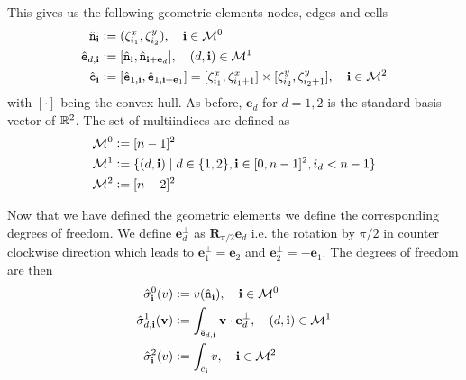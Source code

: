\documentclass[../master_thesis.tex]{subfiles}
\begin{document}
This gives us the following geometric elements nodes, edges and cells
\begin{align*}
    \hat{\mathtt{n}}_\mathbf{i} &\vcentcolon= (\zeta^x_{i_1}, \zeta^y_{i_2}), \quad \mathbf{i} \in \mathcal{M}^0
    \\ \hat{\mathtt{e}}_{d,\mathbf{i}} 
        &\vcentcolon= [\hat{\mathtt{n}}_\mathbf{i}, \hat{\mathtt{n}}_{\mathbf{i} + \mathbf{e}_d}] 
        , \quad (d, \mathbf{i}) \in \mathcal{M}^1
    \\ \hat{\mathtt{c}}_\mathbf{i} &\vcentcolon= [\hat{\mathtt{e}}_{1,\mathbf{i}}, \hat{\mathtt{e}}_{1,\mathbf{i} + \mathbf{e}_1}]
        = [\zeta^x_{i_1}, \zeta^x_{i_1+1}] \times [\zeta^y_{i_2}, \zeta^y_{i_2+1}] 
        , \quad \mathbf{i} \in \mathcal{M}^2 
\end{align*}
with $[\cdot]$ being the convex hull. As before, $\mathbf{e}_d$ for $d = 1,2$ is the 
standard basis vector of $\mathbb{R}^2$. 
The set of multiindices are defined as
\begin{align*}
    \mathcal{M}^0 &\vcentcolon= [n-1]^2
    \\ \mathcal{M}^1 &\vcentcolon= \{ (d, \mathbf{i}) \mid d \in \{1,2\}, \mathbf{i} \in [0,n-1]^2, i_d < n-1 \}
    \\ \mathcal{M}^2 &\vcentcolon= [n-2]^2
\end{align*}

Now that we have defined the geometric elements we define the corresponding 
degrees of freedom. 
We define $\mathbf{e}_d^\perp$ as $\mathbf{R}_{\pi/2}\mathbf{e}_d$ i.e. the rotation by $\pi /2$ in counter clockwise 
direction which leads to $\mathbf{e}^\perp_1= \mathbf{e}_2$ and $\mathbf{e}^\perp_2= -\mathbf{e}_1$. 
The degrees of freedom are then
\begin{align*}
    \hat{\sigma}_\mathbf{i}^0(v)  &\vcentcolon= v(\hat{\mathtt{n}}_\mathbf{i}), \quad \mathbf{i} \in \mathcal{M}^0
    \\ \hat{\sigma}^1_{d,\mathbf{i}}(\mathbf{v})  
        &\vcentcolon= \int_{\hat{\mathtt{e}}_{d,\mathbf{i}}} \mathbf{v} \cdot \mathbf{e}^\perp_d 
        , \quad (d, \mathbf{i}) \in \mathcal{M}^1
    \\ \hat{\sigma}_{\mathbf{i}}^2(v) 
        &\vcentcolon= \int_{\hat{c}_{\mathbf{i}}} v 
        , \quad \mathbf{i} \in \mathcal{M}^2
\end{align*}
\end{document}

